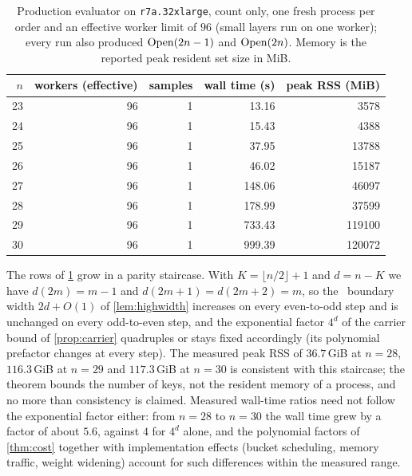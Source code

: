 \begin{table}[t]
\centering
\caption{Production evaluator on \texttt{r7a.32xlarge}, count only, one
fresh process per order and an effective worker limit of $96$ (small layers
run on one worker); every run also produced $\operatorname{Open}(2n-1)$ and $\operatorname{Open}(2n)$.
Memory is the reported peak resident set size in MiB.}
\label{tab:campaign}
\begin{tabular}{rrrrr}
\toprule
$n$ & workers (effective) & samples & wall time (s) & peak RSS (MiB) \\
\midrule
23 & 96 & 1 & 13.16 & 3578 \\
24 & 96 & 1 & 15.43 & 4388 \\
25 & 96 & 1 & 37.95 & 13788 \\
26 & 96 & 1 & 46.02 & 15187 \\
27 & 96 & 1 & 148.06 & 46097 \\
28 & 96 & 1 & 178.99 & 37599 \\
29 & 96 & 1 & 733.43 & 119100 \\
30 & 96 & 1 & 999.39 & 120072 \\
\bottomrule
\end{tabular}
\end{table}

The rows of \cref{tab:campaign} grow in a parity staircase. With
$K=\lfloor n/2\rfloor+1$ and $d=n-K$ we have $d(2m)=m-1$ and
$d(2m+1)=d(2m+2)=m$, so the \HIGH\ boundary width $2d+O(1)$ of
\cref{lem:highwidth} increases on every even-to-odd step and is unchanged on
every odd-to-even step, and the exponential factor $4^{d}$ of the carrier
bound of \cref{prop:carrier} quadruples or stays fixed accordingly (its
polynomial prefactor changes at every step). The measured peak
RSS of $36.7$\,GiB at $n=28$, $116.3$\,GiB at $n=29$ and $117.3$\,GiB at
$n=30$ is consistent with this staircase; the theorem bounds the number of
keys, not the resident memory of a process, and no more than consistency is
claimed. Measured wall-time ratios need not follow the exponential factor
either: from $n=28$ to $n=30$ the wall time grew by a factor of about $5.6$,
against $4$ for $4^{d}$ alone, and the polynomial factors of \cref{thm:cost}
together with implementation effects (bucket scheduling, memory traffic,
weight widening) account for such differences within the measured range.


